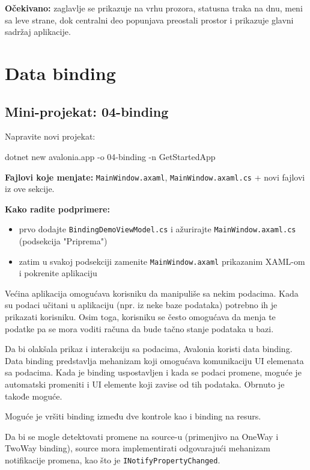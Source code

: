 \documentclass[11pt,a4paper]{article}
\begin{document}
\textbf{Očekivano:} zaglavlje se prikazuje na vrhu prozora, statusna traka na dnu, 
meni sa leve strane, dok centralni deo popunjava preostali prostor i prikazuje 
glavni sadržaj aplikacije.

\section{Data binding}

\subsection*{Mini-projekat: 04-binding}
Napravite novi projekat:

\begin{CodeBlock}
dotnet new avalonia.app -o 04-binding -n GetStartedApp
\end{CodeBlock}

\textbf{Fajlovi koje menjate:} \texttt{MainWindow.axaml}, \texttt{MainWindow.axaml.cs} + novi fajlovi iz ove sekcije.

\textbf{Kako radite podprimere:}
\begin{itemize}[leftmargin=*]
  \item prvo dodajte \texttt{BindingDemoViewModel.cs} i ažurirajte \texttt{MainWindow.axaml.cs} (podsekcija "Priprema")
  \item zatim u svakoj podsekciji zamenite \texttt{MainWindow.axaml} prikazanim XAML-om i pokrenite aplikaciju
\end{itemize}

Većina aplikacija omogućava korisniku da manipuliše sa nekim podacima. Kada su podaci učitani u aplikaciju (npr. iz neke baze podataka) potrebno ih je prikazati korisniku. Osim toga, korisniku se često omogućava da menja te podatke pa se mora voditi računa da bude tačno stanje podataka u bazi.

Da bi olakšala prikaz i interakciju sa podacima, Avalonia koristi data binding. Data binding predstavlja mehanizam koji omogućava komunikaciju UI elemenata sa podacima. Kada je binding uspostavljen i kada se podaci promene, moguće je automatski promeniti i UI elemente koji zavise od tih podataka. Obrnuto je takođe moguće.

Moguće je vršiti binding između dve kontrole kao i binding na resurs.

Da bi se mogle detektovati promene na source-u (primenjivo na OneWay i TwoWay binding), source mora implementirati odgovarajući mehanizam notifikacije promena, kao što je \texttt{INotifyPropertyChanged}.
\end{document}
